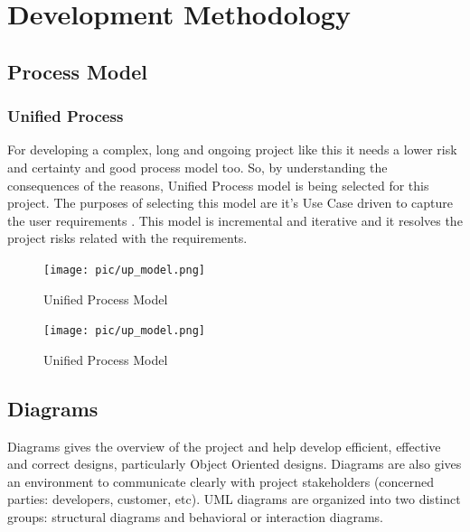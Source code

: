 \documentclass[12pt]{report} %
\begin{document}
\chapter{Development Methodology}
\setcounter{page}{1}
\thispagestyle{empty}    %

\section{Process Model}
\subsection{Unified Process}
For developing a complex, long and ongoing project like this it needs a lower risk and certainty and good process model too. So, by understanding the consequences of the reasons, Unified Process model is being selected for this project. The purposes of selecting this model are it's Use Case driven to capture the user requirements . This model is incremental and iterative and it resolves the project risks related with the requirements.
%
\ifx
\begin{figure}[h]
	\begin{center}
	\texttt{[image: pic/up\_model.png]}
	\end{center}
	\caption{Unified Process Model}
	\label{fig:up_model}
\end{figure}
\fi

\begin{figure}[h]
	\begin{center}
	\texttt{[image: pic/up\_model.png]}
	\end{center}
	\caption[]{Unified Process Model}
	\label{fig:up_model}
\end{figure}
\clearpage



\section{Diagrams}
Diagrams gives the overview of the project and help develop efficient, effective and correct designs, particularly Object Oriented designs. Diagrams are also gives an environment to communicate clearly with project stakeholders (concerned parties:  developers, customer, etc).
UML diagrams are organized into two distinct groups: structural diagrams and behavioral or interaction diagrams.\\
\end{document}

